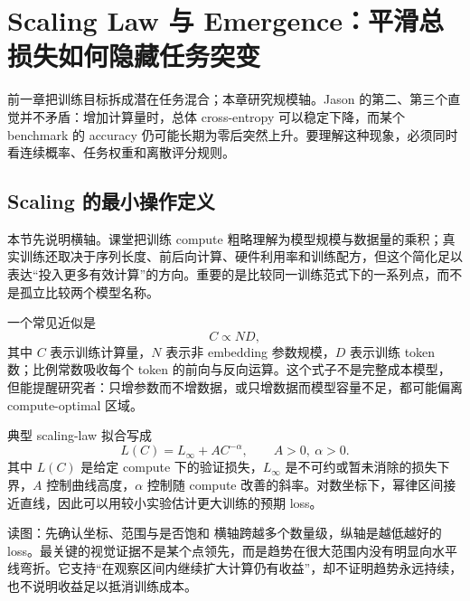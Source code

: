 \section{Scaling Law 与 Emergence：平滑总损失如何隐藏任务突变}

前一章把训练目标拆成潜在任务混合；本章研究规模轴。Jason 的第二、第三个直觉并不矛盾：增加计算量时，总体 cross-entropy 可以稳定下降，而某个 benchmark 的 accuracy 仍可能长期为零后突然上升。要理解这种现象，必须同时看连续概率、任务权重和离散评分规则。

\subsection{Scaling 的最小操作定义}

本节先说明横轴。课堂把训练 compute 粗略理解为模型规模与数据量的乘积；真实训练还取决于序列长度、前后向计算、硬件利用率和训练配方，但这个简化足以表达“投入更多有效计算”的方向。重要的是比较同一训练范式下的一系列点，而不是孤立比较两个模型名称。


一个常见近似是
\[
C\propto N D,
\]
其中 $C$ 表示训练计算量，$N$ 表示非 embedding 参数规模，$D$ 表示训练 token 数；比例常数吸收每个 token 的前向与反向运算。这个式子不是完整成本模型，但能提醒研究者：只增参数而不增数据，或只增数据而模型容量不足，都可能偏离 compute-optimal 区域。


典型 scaling-law 拟合写成
\[
L(C)=L_{\infty}+A C^{-\alpha},\qquad A>0,\ \alpha>0.
\]
其中 $L(C)$ 是给定 compute 下的验证损失，$L_{\infty}$ 是不可约或暂未消除的损失下界，$A$ 控制曲线高度，$\alpha$ 控制随 compute 改善的斜率。对数坐标下，幂律区间接近直线，因此可以用较小实验估计更大训练的预期 loss。

\begin{knowledgebox}{读图：先确认坐标、范围与是否饱和}
横轴跨越多个数量级，纵轴是越低越好的 loss。最关键的视觉证据不是某个点领先，而是趋势在很大范围内没有明显向水平线弯折。它支持“在观察区间内继续扩大计算仍有收益”，却不证明趋势永远持续，也不说明收益足以抵消训练成本。
\end{knowledgebox}


